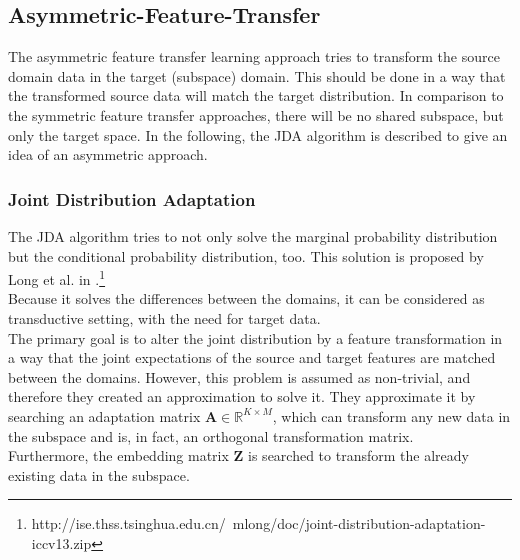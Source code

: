\subsection{Asymmetric-Feature-Transfer}\label{TlSubSecHomoAsymFeature}
The asymmetric feature transfer learning approach tries to transform the source domain data in the target (subspace) domain.
This should be done in a way that the transformed source data will match the target distribution.
In comparison to the symmetric feature transfer approaches, there will be no shared subspace, but only the target space.
In the following, the \ac{JDA} algorithm is described to give an idea of an asymmetric approach.\cite[p. 6; 10]{Weiss.2016}
\subsubsection{Joint Distribution Adaptation}
The \acl{JDA} algorithm tries to not only solve the marginal probability distribution but the conditional probability distribution, too.
This solution is proposed by Long et al. in \cite{Long.}.\footnote{http://ise.thss.tsinghua.edu.cn/~mlong/doc/joint-distribution-adaptation-iccv13.zip}\\
Because it solves the differences between the domains, it can be considered as transductive setting, with the need for target data.\\
The primary goal is to alter the joint distribution by a feature transformation in a way that the joint expectations of the source and target features are matched between the domains.
However, this problem is assumed as non-trivial, and therefore they created an approximation to solve it.
They approximate it by searching an adaptation matrix $\mathbf{A} \in \mathbb{R}^{K\times M}$, which can transform any new data in the subspace and is, in fact, an orthogonal transformation matrix.\cite{Long.}\\
Furthermore, the embedding matrix $\mathbf{Z}$ is searched to transform the already existing data in the subspace.

